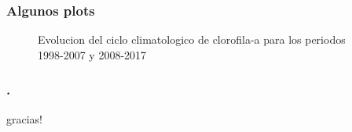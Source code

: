 \documentclass{beamer}
\begin{document}
\begin{frame}
	
	\frametitle{Algunos plots}
	\begin{figure}
	\caption{Evolucion del ciclo climatologico de clorofila-a para los periodos 1998-2007 y 2008-2017}	
	\end{figure}
	
\end{frame}

\begin{frame}
	
	\frametitle{.}

\Huge gracias!
	
\end{frame}
\end{document}

